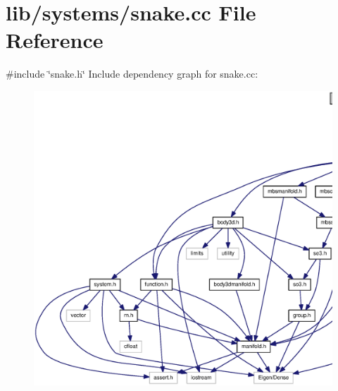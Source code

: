 \section{lib/systems/snake.cc \-File \-Reference}
\label{snake_8cc}
{\ttfamily \#include \char`\"{}snake.\-h\char`\"{}}\*
\-Include dependency graph for snake.\-cc\-:
\nopagebreak
\begin{figure}[H]
\begin{center}
\leavevmode
\includegraphics[width=350pt]{snake_8cc__incl}
\end{center}
\end{figure}
